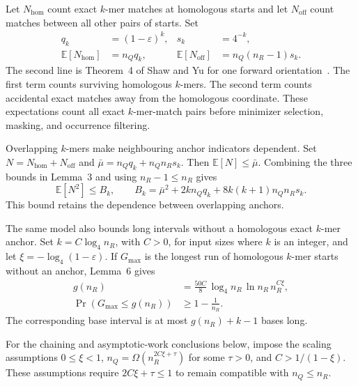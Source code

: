 Let \(N_{\mathrm{hom}}\) count exact \(k\)-mer matches at homologous starts and
let \(N_{\mathrm{off}}\) count matches between all other pairs of starts. Set
\begin{equation}
  \begin{aligned}
    q_k&=(1-\varepsilon)^k,
    &s_k&=4^{-k},\\
    \mathbb E[N_{\mathrm{hom}}]&=n_Qq_k,
    &\mathbb E[N_{\mathrm{off}}]&=n_Q(n_R-1)s_k.
  \end{aligned}
  \label{eq:chaining-average-anchor-counts}
\end{equation}
The second line is Theorem~4 of Shaw and Yu for one forward
orientation~\cite{shaw_yu_seed_chain_extend_2023}.
The first term counts surviving homologous \(k\)-mers. The second term counts
accidental exact matches away from the homologous coordinate. These
expectations count all exact \(k\)-mer-match pairs before minimizer selection,
masking, and occurrence filtering.

Overlapping \(k\)-mers make neighbouring anchor indicators dependent. Set
\(N=N_{\mathrm{hom}}+N_{\mathrm{off}}\) and
\(\bar\mu=n_Qq_k+n_Qn_Rs_k\). Then
\(\mathbb E[N]\leq\bar\mu\). Combining the three bounds in Lemma~3 and using
\(n_R-1\leq n_R\) gives~\cite{shaw_yu_seed_chain_extend_2023}
\begin{equation}
  \mathbb E[N^2]\leq B_k,
  \qquad
  B_k=\bar\mu^2+2kn_Qq_k+8k(k+1)n_Qn_Rs_k.
  \label{eq:chaining-average-anchor-second-moment}
\end{equation}
This bound retains the dependence between overlapping anchors.

The same model also bounds long intervals without a homologous exact
\(k\)-mer anchor. Set \(k=C\log_4n_R\), with \(C>0\), for input sizes where
\(k\) is an integer, and let \(\xi=-\log_4(1-\varepsilon)\). If
\(G_{\max}\) is the longest run of homologous \(k\)-mer starts without an
anchor, Lemma~6 gives~\cite{shaw_yu_seed_chain_extend_2023}
\begin{equation}
  \begin{aligned}
    g(n_R)&=\frac{50C}{8}\,
      \log_4 n_R\,\ln n_R\,n_R^{C\xi},\\
    \Pr\!\left(G_{\max}\leq g(n_R)\right)&\geq1-\frac{1}{n_R}.
  \end{aligned}
  \label{eq:chaining-average-largest-gap}
\end{equation}
The corresponding base interval is at most \(g(n_R)+k-1\) bases long.

For the chaining and asymptotic-work conclusions below, impose the scaling
assumptions \(0\leq\xi<1\),
\(n_Q=\Omega(n_R^{2C\xi+\tau})\) for some \(\tau>0\), and
\(C>1/(1-\xi)\). These assumptions require \(2C\xi+\tau\leq1\) to remain
compatible with \(n_Q\leq n_R\).

